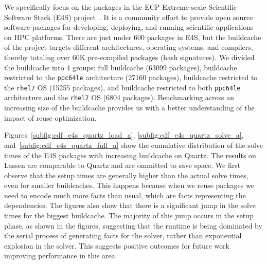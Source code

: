 % 

We specifically focus on the packages in the ECP Extreme-scale Scientific Software Stack
(E4S) project~\cite{e4s}. It is a community effort to provide open source software
packages for developing, deploying, and running scientific applications on HPC
platforms. There are just under 600 packages in E4S, but the buildcache of the project
targets different architectures, operating systems, and compilers, thereby totaling over
60K pre-compiled packages (hash signatures). We divided the buildcache into 4 groups:
full buildcache (63099 packages), buildcache restricted to the \texttt{ppc64le}
architecture (27160 packages), buildcache restricted to the \texttt{rhel7} OS (15255
packages), and buildcache restricted to both \texttt{ppc64le} architecture and the
\texttt{rhel7} OS (6804 packages). Benchmarking across an increasing size of the
buildcache provides us with a better understanding of the impact of reuse optimization.


Figures~\ref{subfig:cdf_e4s_quartz_load_a}, \ref{subfig:cdf_e4s_quartz_solve_a}, and~\ref{subfig:cdf_e4s_quartz_full_a} show the cumulative distribution of the solve times of the E4S packages with increasing buildcache on Quartz. The results on Lassen are comparable to Quartz and are ommitted to save space. We first observe that the setup times are generally higher than the actual solve times, even for smaller buildcaches. This happens because when we reuse packages we need to encode much more facts than usual, which are facts representing the dependencies. The figures also show that there is a significant jump in the solve times for the biggest buildcache. The majority of this jump occurs in the setup phase, as shown in the figures, suggesting that the runtime is being dominated by the serial process of generating facts for the solver, rather than exponential explosion in the solver. This suggests positive outcomes for future work improving performance in this area.

% 
